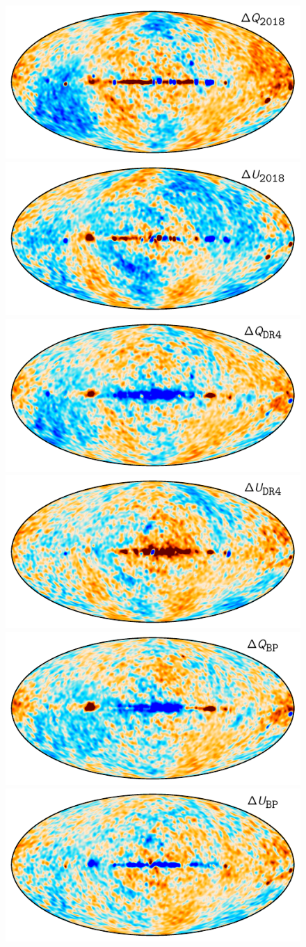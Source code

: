 \documentclass[twocolumn]{aa}
\begin{document}
\begin{figure}[p]
    \center
    \includegraphics[width=0.495\linewidth]{figs/diff_dpc_k_3deg_Q.pdf}
    \includegraphics[width=0.495\linewidth]{figs/diff_dpc_k_3deg_U.pdf}\\
    \includegraphics[width=0.495\linewidth]{figs/diff_npipe_k_3deg_Q.pdf}
    \includegraphics[width=0.495\linewidth]{figs/diff_npipe_k_3deg_U.pdf}\\
    \includegraphics[width=0.495\linewidth]{figs/diff_bp10_k_3deg_Q.pdf}
    \includegraphics[width=0.495\linewidth]{figs/diff_bp10_k_3deg_U.pdf}\\

\end{figure}
\end{document}
